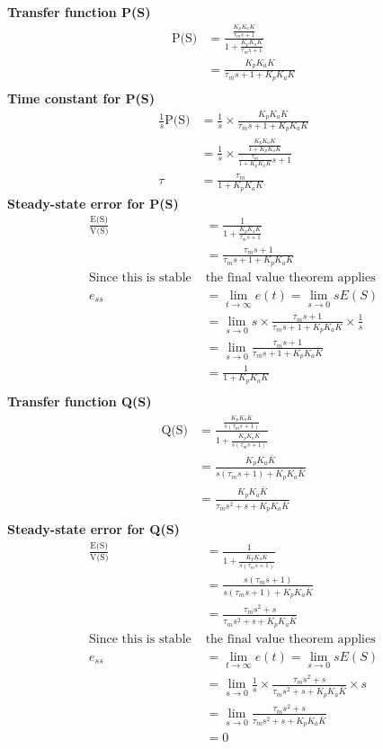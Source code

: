 \documentclass{article}
\begin{document}

\textbf{Transfer function P(S)}
\begin{align*}
    \text{P(S)}&= \frac{\frac{K_p K_a K}{\tau_m s + 1}}{1 + \frac{K_p K_a K}{\tau_m s + 1}}\\
        &= \frac{K_p K_a K}{\tau_m s + 1 + K_p K_a K}\\
\end{align*}
\textbf{Time constant for P(S)}
\begin{align*}
    \frac{1}{s}\text{P(S)} &= \frac{1}{s} \times \frac{K_p K_a K}{\tau_m s + 1 + K_p K_a K}\\
        &= \frac{1}{s} \times \frac{\frac{K_p K_a K}{1 + K_p K_a K}}{\frac{\tau_m}{1 + K_p K_a K} s + 1}\\
    \tau &= \frac{\tau_m}{1 + K_p K_a K}
\end{align*}
\textbf{Steady-state error for P(S)}
\begin{align*}
    \frac{\text{E(S)}}{\text{V(S)}} &= \frac{1}{1 + \frac{K_p K_a K}{\tau_m s + 1}}\\
        &= \frac{\tau_m s + 1}{\tau_m s + 1 + K_p K_a K}\\
        \text{Since this is stable } & \text{the final value theorem applies}\\
    e_{ss} &= \lim_{t\to\infty} e(t) = \lim_{s\to 0} sE(S)\\
        &= \lim_{s\to 0} s \times \frac{\tau_m s + 1}{\tau_m s + 1 + K_p K_a K} \times \frac{1}{s}\\
        &= \lim_{s\to 0} \frac{\tau_m s + 1}{\tau_m s + 1 + K_p K_a K}\\
        &= \frac{1}{1 + K_p K_a K}\\
\end{align*}
\textbf{Transfer function Q(S)}
\begin{align*}
    \text{Q(S)}&= \frac{\frac{K_p K_a \bar{K}}{s(\tau_m s + 1)}}{1 + \frac{K_p K_a \bar{K}}{s(\tau_m s + 1)}}\\
        &= \frac{K_p K_a \bar{K}}{s(\tau_m s + 1) + K_p K_a \bar{K}}\\
        &= \frac{K_p K_a \bar{K}}{\tau_m s^2 + s + K_p K_a \bar{K}}\\
\end{align*}
\textbf{Steady-state error for Q(S)}
\begin{align*}
    \frac{\text{E(S)}}{\text{V(S)}} &= \frac{1}{1 + \frac{K_p K_a \bar{K}}{s(\tau_m s + 1)}}\\
        &= \frac{s(\tau_m s + 1)}{s(\tau_m s + 1) + K_p K_a \bar{K}}\\
        &= \frac{\tau_m s^2 + s}{\tau_m s^2 + s + K_p K_a \bar{K}}\\
    \text{Since this is stable } & \text{the final value theorem applies}\\
    e_{ss} &= \lim_{t\to\infty} e(t) = \lim_{s\to 0} sE(S)\\
            &=\lim_{s\to 0} \frac{1}{s} \times \frac{\tau_m s^2 + s}{\tau_m s^2 + s + K_p K_a \bar{K}} \times s\\
            &=\lim_{s\to 0} \frac{\tau_m s^2 + s}{\tau_m s^2 + s + K_p K_a \bar{K}}\\
            &= 0
\end{align*}
\end{document}

